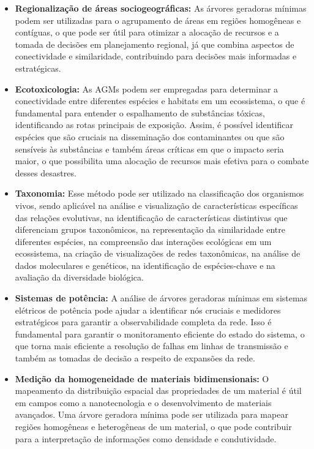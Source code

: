 \documentclass{article}
\begin{document}
\begin{itemize}
    \item \textbf{Regionalização de áreas sociogeográficas: } As árvores geradoras mínimas podem ser utilizadas para o agrupamento de áreas em regiões homogêneas e contíguas, o que pode ser útil para otimizar a alocação de recursos e a tomada de decisões em planejamento regional, já que combina aspectos de conectividade e similaridade, contribuindo para decisões mais informadas e estratégicas.
    
    \item \textbf{Ecotoxicologia: } As AGMs podem ser empregadas para determinar a conectividade entre diferentes espécies e habitats em um ecossistema, o que é fundamental para entender o espalhamento de substâncias tóxicas, identificando as rotas principais de exposição. Assim, é possível identificar espécies que são cruciais na disseminação dos contaminantes ou que são sensíveis às substâncias e também áreas críticas em que o impacto seria maior, o que possibilita uma alocação de recursos mais efetiva para o combate desses desastres.
    
    \item \textbf{Taxonomia: } Esse método pode ser utilizado na classificação dos organismos vivos, sendo aplicável na análise e visualização de características específicas das relações evolutivas, na identificação de características distintivas que diferenciam grupos taxonômicos, na representação da similaridade entre diferentes espécies, na compreensão das interações ecológicas em um ecossistema, na criação de visualizações de redes taxonômicas, na análise de dados moleculares e genéticos, na identificação de espécies-chave e na avaliação da diversidade biológica.
    
    \item \textbf{Sistemas de potência: } A análise de árvores geradoras mínimas em sistemas elétricos de potência pode ajudar a identificar nós cruciais e medidores estratégicos para garantir a observabilidade completa da rede. Isso é fundamental para garantir o monitoramento eficiente do estado do sistema, o que torna mais eficiente a resolução de falhas em linhas de transmissão e também as tomadas de decisão a respeito de expansões da rede.
    
    \item \textbf{Medição da homogeneidade de materiais bidimensionais: } O mapeamento da distribuição espacial das propriedades de um material é útil em campos como a nanotecnologia e o desenvolvimento de materiais avançados. Uma árvore geradora mínima pode ser utilizada para mapear regiões homogêneas e heterogêneas de um material, o que pode contribuir para a interpretação de informações como densidade e condutividade.
    

\end{itemize}
\end{document}
